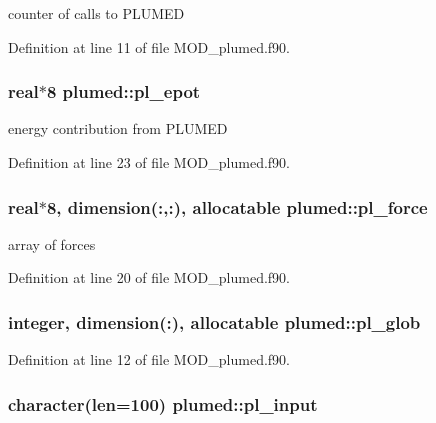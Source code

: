 counter of calls to P\-L\-U\-M\-E\-D 



Definition at line 11 of file M\-O\-D\-\_\-plumed.\-f90.

\hypertarget{classplumed_a22629a6612c2ebc50f88c7ef94bdd525}{
\subsubsection[{pl\-\_\-epot}]{\setlength{\rightskip}{0pt plus 5cm}real$\ast$8 plumed\-::pl\-\_\-epot}}\label{classplumed_a22629a6612c2ebc50f88c7ef94bdd525}


energy contribution from P\-L\-U\-M\-E\-D 



Definition at line 23 of file M\-O\-D\-\_\-plumed.\-f90.

\hypertarget{classplumed_a9df9be4d1fe11d88a9dcf400d3c43b7a}{
\subsubsection[{pl\-\_\-force}]{\setlength{\rightskip}{0pt plus 5cm}real$\ast$8, dimension(\-:,\-:), allocatable plumed\-::pl\-\_\-force}}\label{classplumed_a9df9be4d1fe11d88a9dcf400d3c43b7a}


array of forces 



Definition at line 20 of file M\-O\-D\-\_\-plumed.\-f90.

\hypertarget{classplumed_a4f45b852b65341ea5c02adc73a3e5858}{
\subsubsection[{pl\-\_\-glob}]{\setlength{\rightskip}{0pt plus 5cm}integer, dimension(\-:), allocatable plumed\-::pl\-\_\-glob}}\label{classplumed_a4f45b852b65341ea5c02adc73a3e5858}


Definition at line 12 of file M\-O\-D\-\_\-plumed.\-f90.

\hypertarget{classplumed_aedc087d82d6aa6aa260cd90dfd428051}{
\subsubsection[{pl\-\_\-input}]{\setlength{\rightskip}{0pt plus 5cm}character(len=100) plumed\-::pl\-\_\-input}}\label{classplumed_aedc087d82d6aa6aa260cd90dfd428051}


